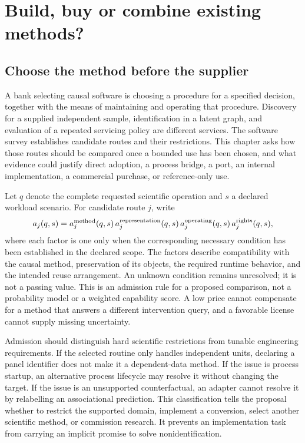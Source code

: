 \chapter{Build, buy or combine existing methods?}
\label{exec16:s10}

\section{Choose the method before the supplier}

A bank selecting causal software is choosing a procedure for a specified
decision, together with the means of maintaining and operating that procedure.
Discovery for a supplied independent sample, identification in a latent graph,
and evaluation of a repeated servicing policy are different services. The
software survey establishes candidate routes and their restrictions. This
chapter asks how those routes should be compared once a bounded use has been
chosen, and what evidence could justify direct adoption, a process bridge, a
port, an internal implementation, a commercial purchase, or reference-only use.

Let \(q\) denote the complete requested scientific operation and \(s\) a
declared workload scenario. For candidate route \(j\), write
\[
 a_j(q,s)=a_j^{\rm method}(q,s)\,a_j^{\rm representation}(q,s)
          \,a_j^{\rm operating}(q,s)\,a_j^{\rm rights}(q,s),
\]
where each factor is one only when the corresponding necessary condition has
been established in the declared scope. The factors describe compatibility
with the causal method, preservation of its objects, the required runtime
behavior, and the intended reuse arrangement. An unknown condition remains
unresolved; it is not a passing value. This is an admission rule for a proposed
comparison, not a probability model or a weighted capability score. A low
price cannot compensate for a method that answers a different intervention
query, and a favorable license cannot supply missing uncertainty.
\citep{exec16_s10_design}

Admission should distinguish hard scientific restrictions from tunable
engineering requirements. If the selected routine only handles independent
units, declaring a panel identifier does not make it a dependent-data method.
If the issue is process startup, an alternative process lifecycle may resolve
it without changing the target. If the issue is an unsupported counterfactual,
an adapter cannot resolve it by relabelling an associational prediction. This
classification tells the proposal whether to restrict the supported domain,
implement a conversion, select another scientific method, or commission
research. It prevents an implementation task from carrying an implicit promise
to solve nonidentification.

